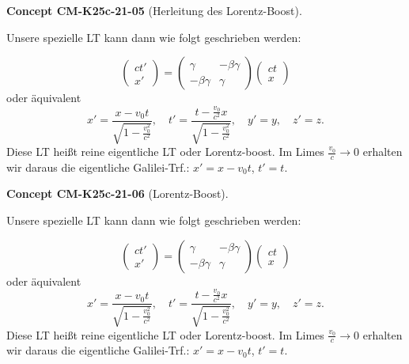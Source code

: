 \documentclass[10pt, letterpaper]{article}
\newcommand{\CustomHeading}[3]{%
  \par\medskip\noindent%
  \textbf{#1 #2} \textnormal{(#3)}.\enskip%
}
\newenvironment{CONC}[2]{\CustomHeading{Concept}{#1}{#2}}{}
\begin{document}
\begin{CONC}{CM-K25c-21-05}{Herleitung des Lorentz-Boost}
Unsere spezielle LT kann dann wie folgt geschrieben werden:

\[
\begin{pmatrix} ct' \\ x' \end{pmatrix} = 
\begin{pmatrix}
\gamma & -\beta\gamma \\
-\beta\gamma & \gamma
\end{pmatrix}
\begin{pmatrix} ct \\ x \end{pmatrix}
\]
oder äquivalent
\[
x' = \frac{x-v_0t}{\sqrt{1-\frac{v_0^2}{c^2}}}, \quad t' = \frac{t-\frac{v_0}{c^2}x}{\sqrt{1-\frac{v_0^2}{c^2}}}, \quad y'=y, \quad z'=z.
\]
Diese LT heißt reine eigentliche LT oder Lorentz-boost. Im Limes $\frac{v_0}{c} \to 0$ erhalten wir daraus die eigentliche Galilei-Trf.: $x'=x-v_0t$, $t'=t$.
\end{CONC}

\begin{CONC}{CM-K25c-21-06}{Lorentz-Boost}
Unsere spezielle LT kann dann wie folgt geschrieben werden:

\[
\begin{pmatrix} ct' \\ x' \end{pmatrix} = 
\begin{pmatrix}
\gamma & -\beta\gamma \\
-\beta\gamma & \gamma
\end{pmatrix}
\begin{pmatrix} ct \\ x \end{pmatrix}
\]
oder äquivalent
\[
x' = \frac{x-v_0t}{\sqrt{1-\frac{v_0^2}{c^2}}}, \quad t' = \frac{t-\frac{v_0}{c^2}x}{\sqrt{1-\frac{v_0^2}{c^2}}}, \quad y'=y, \quad z'=z.
\]
Diese LT heißt reine eigentliche LT oder Lorentz-boost. Im Limes $\frac{v_0}{c} \to 0$ erhalten wir daraus die eigentliche Galilei-Trf.: $x'=x-v_0t$, $t'=t$.
\end{CONC}
\end{document}
